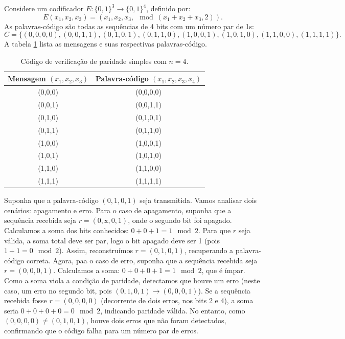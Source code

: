 \begin{example}\label{ex:simplyparitycheck}
Considere um codificador $E: \{0, 1\}^3 \to \{0, 1\}^4$, definido por:
\begin{equation}
E(x_1, x_2, x_3) = \left( x_1, x_2, x_3, \mod(x_1 + x_2 + x_3, 2) \right).
\end{equation}
As palavras-código são todas as sequências de 4 bits com um número par de 1s:
\[
C = \{ (0,0,0,0), (0,0,1,1), (0,1,0,1), (0,1,1,0), (1,0,0,1), (1,0,1,0), (1,1,0,0), (1,1,1,1) \}.
\]
A tabela \ref{tab:paritycode} lista as mensagens e suas respectivas palavras-código.

  \begin{table}[h]
    \centering
    \begin{tabular}{cc}
        \toprule
        Mensagem $(x_1, x_2, x_3)$ & Palavra-código $(x_1, x_2, x_3, x_4)$ \\
        \midrule
        (0,0,0) & (0,0,0,0) \\
        (0,0,1) & (0,0,1,1) \\
        (0,1,0) & (0,1,0,1) \\
        (0,1,1) & (0,1,1,0) \\
        (1,0,0) & (1,0,0,1) \\
        (1,0,1) & (1,0,1,0) \\
        (1,1,0) & (1,1,0,0) \\
        (1,1,1) & (1,1,1,1) \\
        \bottomrule
    \end{tabular}
    \caption{Código de verificação de paridade simples com $n = 4$.}
    \label{tab:paritycode}
\end{table}

Suponha que a palavra-código $(0,1,0,1)$ seja transmitida. Vamos analisar dois cenários: apagamento e erro.
Para o caso de apagamento, suponha que a sequência recebida seja $r = (0, \text{x}, 0, 1)$, 
onde o segundo bit foi apagado. Calculamos a soma dos bits conhecidos: $0 + 0 + 1 = 1 \mod 2$.
Para que $r$ seja válida, a soma total deve ser par, logo o bit apagado deve ser 1 (pois $1 + 1 = 0 \mod 2$). 
Assim, reconstruímos $r = (0,1,0,1)$, recuperando a palavra-código correta.
Agora, paa o caso de erro, suponha que a sequência recebida seja $r = (0,0,0,1)$. 
Calculamos a soma: $0 + 0 + 0 + 1 = 1 \mod 2$, que é ímpar. 
Como a soma viola a condição de paridade, detectamos que houve um erro 
(neste caso, um erro no segundo bit, pois $(0,1,0,1) \to (0,0,0,1)$).
Se a sequência recebida fosse $r = (0,0,0,0)$ (decorrente de dois erros, nos bits 2 e 4), 
a soma seria $0 + 0 + 0 + 0 = 0 \mod 2$, indicando paridade válida. 
No entanto, como $(0,0,0,0) \neq (0,1,0,1)$, houve dois erros que não foram detectados,
confirmando que o código falha para um número par de erros.
\end{example}

